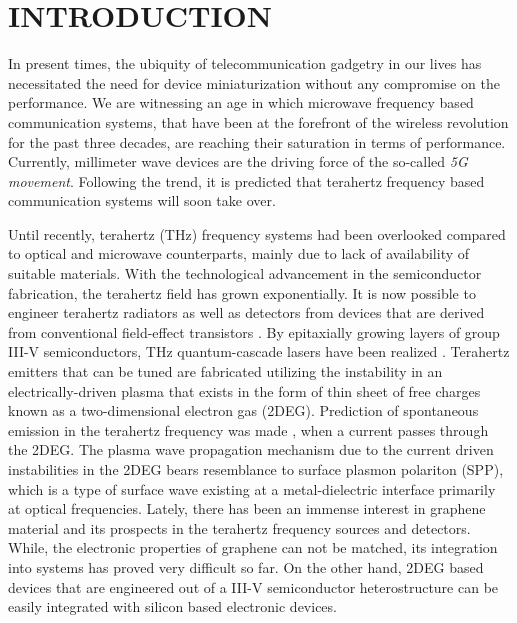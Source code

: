 %
%
%



\pagestyle{plain} %
\setcounter{page}{1}


\chapter{\uppercase {Introduction}}

In present times, the ubiquity of telecommunication gadgetry in our lives has necessitated the need for device miniaturization without any compromise on the performance. We are witnessing an age in which microwave frequency based communication systems, that have been at the forefront of the wireless revolution for the past three decades, are reaching their saturation in terms of performance. Currently, millimeter wave devices are the driving force of the so-called \emph{5G movement}. Following the trend, it is predicted that terahertz frequency based communication systems will soon take over.

Until recently, terahertz (THz) frequency systems had been overlooked compared to optical and microwave counterparts, mainly due to lack of availability of suitable materials. With the technological advancement in the semiconductor fabrication, the terahertz field has grown exponentially. It is now possible to engineer terahertz radiators as well as detectors from devices that are derived from conventional field-effect transistors \cite{Kempa1991,Dyakonov1993,Dyakonov2001}. By epitaxially growing layers of group III-V semiconductors, THz quantum-cascade lasers have been realized \cite{Williams2003}. Terahertz emitters that can be tuned are fabricated utilizing the instability in an electrically-driven plasma \cite{Krasheninnikov1980} that exists in the form of thin sheet of free charges known as a two-dimensional electron gas (2DEG). Prediction of spontaneous emission in the terahertz frequency was made \cite{Kempa1991}, when a current passes through the 2DEG. The plasma wave propagation mechanism due to the current driven instabilities in the 2DEG bears resemblance to surface plasmon polariton (SPP), which is a type of surface wave existing at a metal-dielectric interface primarily at optical frequencies. Lately, there has been an immense interest in graphene material and its prospects in the terahertz frequency sources and detectors. While, the electronic properties of graphene can not be matched, its integration into systems has proved very difficult so far. On the other hand, 2DEG based devices that are engineered out of a III-V semiconductor heterostructure can be easily integrated with silicon based electronic devices.

